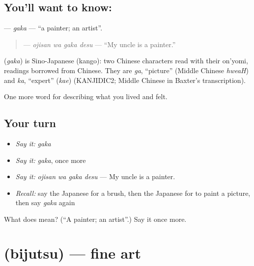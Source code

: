\subsection*{You'll want to know: }
\textbf{} — \emph{gaka} — \textquotedblleft{}a painter; an artist\textquotedblright{}.

\begin{quote}
\textbf{ } — \emph{ojisan wa gaka desu} — \textquotedblleft{}My uncle is a painter.\textquotedblright{}
\end{quote}

\begin{cousinweb}
\textbf{} (\emph{gaka}) is Sino-Japanese (kango): two Chinese characters read with their on'yomi, readings borrowed from Chinese. They are \emph{ga}, \textquotedblleft{}picture\textquotedblright{} (Middle Chinese \emph{hweaH}) and \emph{ka}, \textquotedblleft{}expert\textquotedblright{} (\emph{kae}) (KANJIDIC2; Middle Chinese in Baxter's transcription).
\end{cousinweb}

\begin{grammarlens}[title={What you've built}]
One more word for describing what you lived and felt.
\end{grammarlens}

\subsection*{Your turn}
\begin{itemize}
\raggedright
  \item \emph{Say it:} \emph{gaka}
  \item \emph{Say it:} \emph{gaka}, once more
  \item \emph{Say it:} \emph{ojisan wa gaka desu} — My uncle is a painter.
  \item \emph{Recall:} say the Japanese for a brush, then the Japanese for to paint a picture, then say \emph{gaka} again
\end{itemize}

\begin{tcolorbox}[breakable,colback=teal!4,colframe=teal!35!black,title={Before you move on}]
What does  mean? (\textquotedblleft{}A painter; an artist\textquotedblright{}.) Say it once more.
\end{tcolorbox}
\section[\texorpdfstring{\ja{びじゅつ} (bijutsu)}{びじゅつ (bijutsu)}]{ (bijutsu) — fine art}

